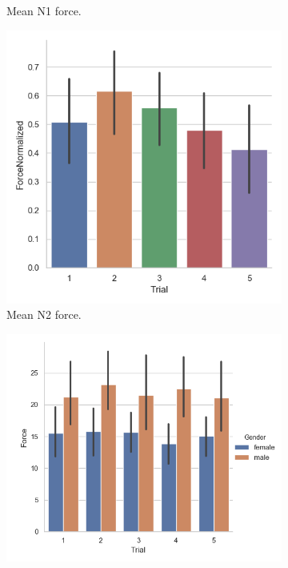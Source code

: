 \begin{figure}[H]
\begin{subfigure}[b]{0.3\textwidth}
         \caption{Mean N1 force.}
         \label{fig:forceN1Trial}
     \end{subfigure}
      \begin{subfigure}[b]{0.3\textwidth}
         \centering
         \includegraphics[scale=0.4]{Files/Plots/forceNormalized_mean_by_trial.png}
         \caption{Mean N2 force.}
         \label{fig:forceN2Trial}
     \end{subfigure}
         \begin{subfigure}[b]{0.3\textwidth}
         \centering
         \includegraphics[scale=0.4]{Files/Plots/force_mean_by_trial_gen.png}

\end{subfigure}
\end{figure}
